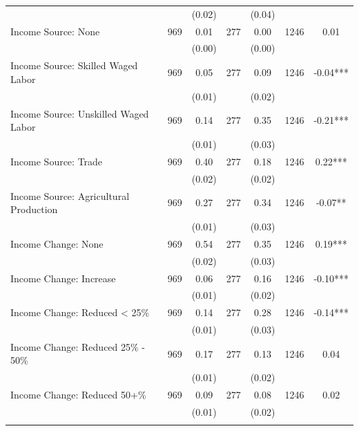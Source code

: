 \begin{tabular}{@{\extracolsep{5pt}}lcccccc}
 &   & (0.02)  &   & (0.04)  &   &  \\ [1ex]
Income Source: None   & 969    & 0.01    & 277    & 0.00    & 1246    & 0.01   \\
 &   & (0.00)  &   & (0.00)  &   &  \\ [1ex]
Income Source: Skilled Waged Labor   & 969    & 0.05    & 277    & 0.09    & 1246    & -0.04***   \\
 &   & (0.01)  &   & (0.02)  &   &  \\ [1ex]
Income Source: Unskilled Waged Labor   & 969    & 0.14    & 277    & 0.35    & 1246    & -0.21***   \\
 &   & (0.01)  &   & (0.03)  &   &  \\ [1ex]
Income Source: Trade   & 969    & 0.40    & 277    & 0.18    & 1246    & 0.22***   \\
 &   & (0.02)  &   & (0.02)  &   &  \\ [1ex]
Income Source: Agricultural Production   & 969    & 0.27    & 277    & 0.34    & 1246    & -0.07**   \\
 &   & (0.01)  &   & (0.03)  &   &  \\ [1ex]
Income Change: None   & 969    & 0.54    & 277    & 0.35    & 1246    & 0.19***   \\
 &   & (0.02)  &   & (0.03)  &   &  \\ [1ex]
Income Change: Increase   & 969    & 0.06    & 277    & 0.16    & 1246    & -0.10***   \\
 &   & (0.01)  &   & (0.02)  &   &  \\ [1ex]
Income Change: Reduced < 25\%   & 969    & 0.14    & 277    & 0.28    & 1246    & -0.14***   \\
 &   & (0.01)  &   & (0.03)  &   &  \\ [1ex]
Income Change: Reduced 25\% - 50\%   & 969    & 0.17    & 277    & 0.13    & 1246    & 0.04   \\
 &   & (0.01)  &   & (0.02)  &   &  \\ [1ex]
Income Change: Reduced 50+\%   & 969    & 0.09    & 277    & 0.08    & 1246    & 0.02   \\
 &   & (0.01)  &   & (0.02)  &   &  \\ [1ex]
\hline \hline \\[-1.8ex]

\end{tabular}

